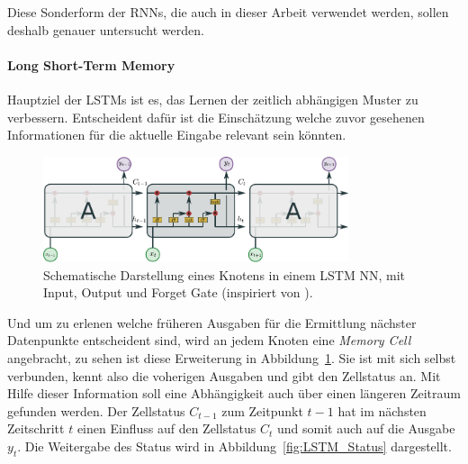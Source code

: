             Diese Sonderform der RNNs, die auch in dieser Arbeit verwendet werden, sollen deshalb genauer untersucht werden.
   	
            \paragraph{Long Short-Term Memory} 
        
                Hauptziel der LSTMs ist es, das Lernen der zeitlich abhängigen Muster zu verbessern.
                Entscheident dafür ist die Einschätzung welche zuvor gesehenen Informationen für die aktuelle Eingabe relevant sein könnten.
                
                \begin{figure}[ht]
                    \centering
                    \includegraphics[width=0.8\textwidth]{images/Illustrationen/LSTM}
                    \caption{Schematische Darstellung eines Knotens in einem LSTM NN, mit Input, Output und Forget Gate (inspiriert von \cite{OLAH2015}).}
                    \label{fig:LSTM}
                \end{figure}

                Und um zu erlenen welche früheren Ausgaben für die Ermittlung nächster Datenpunkte entscheident sind, wird an jedem Knoten eine \textit{Memory Cell}  angebracht, zu sehen ist diese Erweiterung in Abbildung~\ref{fig:LSTM}.
                Sie ist mit sich selbst verbunden, kennt also die voherigen Ausgaben und gibt den Zellstatus an.
                Mit Hilfe dieser Information soll eine Abhängigkeit auch über einen längeren Zeitraum gefunden werden.
                Der Zellstatus $C_{t-1}$ zum Zeitpunkt $t-1$ hat im nächsten Zeitschritt $t$ einen Einfluss auf den Zellstatus $C_{t}$ und somit auch auf die Ausgabe $y_t$.
                Die Weitergabe des Status wird in Abbildung~\ref{fig:LSTM_Status} dargestellt.

